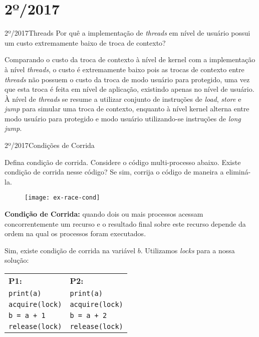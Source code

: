 \section{2º/2017}
\begin{exercicio}
  {2º/2017}{Threads}
  {Por quê a implementação de \textit{threads} em nível de usuário possui um custo extremamente baixo de troca de contexto?}

  Comparando o custo da troca de contexto à nível de kernel com a implementação à nível \textit{threads}, o custo é extremamente baixo pois as trocas de contexto entre \textit{threads} não possuem o custo da troca de modo usuário para protegido, uma vez que esta troca é feita em nível de aplicação, existindo apenas no nível de usuário. À nível de \textit{threads} se resume a utilizar conjunto de instruções de \textit{load}, \textit{store} e \textit{jump} para simular uma troca de contexto, enquanto à nível kernel alterna entre modo usuário para protegido e modo usuário utilizando-se instruções de \textit{long jump}.
\end{exercicio}

\begin{exercicio}
  {2º/2017}{Condições de Corrida}
  {Defina condição de corrida. Considere o código multi-processo abaixo. Existe condição de corrida nesse código? Se sim, corrija o código de maneira a eliminá-la.
  \begin{figure}[H]
    \centering
    \texttt{[image: ex-race-cond]}
  \end{figure}}

  \textbf{Condição de Corrida:} quando dois ou mais processos acessam concorrentemente um recurso e o resultado final sobre este recurso depende da ordem na qual os processos foram executados.

  Sim, existe condição de corrida na variável $b$. Utilizamos \textit{locks} para a nossa solução:

  \begin{table}[H]
    \centering
    \begin{tabular}{l|l}
      \textbf{P1:}            & \textbf{P2:} \\
      \texttt{print(a)}       & \texttt{print(a)} \\
      \texttt{acquire(lock)}  & \texttt{acquire(lock)} \\
      \texttt{b = a + 1}      & \texttt{b = a + 2} \\
      \texttt{release(lock)}  & \texttt{release(lock)}\\
    \end{tabular}
  \end{table}
\end{exercicio}


